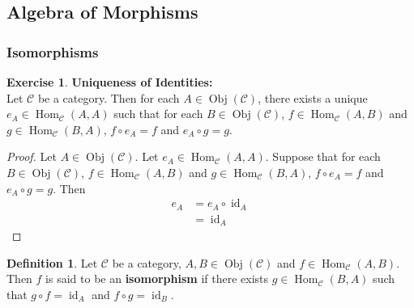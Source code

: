 \documentclass[12pt]{amsart}
\theoremstyle{definition}
\newtheorem{defn}[definition]{Definition}
\newtheorem{ex}[definition]{Exercise}
\newcommand{\MC}{\mathcal{C}}
\DeclareMathOperator{\id}{id}
\DeclareMathOperator{\Obj}{Obj}
\DeclareMathOperator{\Hom}{Hom}
\DeclareMathOperator*{\0}{\mbf{0}}
\DeclareMathOperator*{\1}{\mbf{1}}
\newcommand{\lex}[1]{\label{ex:#1}}
\newcommand{\ld}[1]{\label{defn:#1}}
\begin{document}
	
	
	
	
	
	
	
	
	
	
	
	
	
	
	
	
	
	
	
	
	
	
	
	
	
	
	
	
	
	
	
	
	
	
	
	
	
	
	
	
	
	
	
	
	
	
	
	
	
	
	\newpage
	\subsection{Algebra of Morphisms}
	
	\subsubsection{Isomorphisms}
	
	\begin{ex} \lex{15001} \textbf{Uniqueness of Identities:} \\
		Let $\MC$ be a category. Then for each $A \in \Obj(\MC)$, there exists a unique $e_A \in \Hom_{\MC}(A, A)$ such that for each $B \in \Obj(\MC)$, $f \in \Hom_{\MC}(A, B)$ and $g \in \Hom_{\MC}(B, A)$, $f \circ e_A = f$ and $e_{A} \circ g = g$.
	\end{ex}
	
	\begin{proof}
		Let $A \in \Obj(\MC)$. Let $e_A \in \Hom_{\MC}(A, A)$. Suppose that for each $B \in \Obj(\MC)$, $f \in \Hom_{\MC}(A, B)$ and $g \in \Hom_{\MC}(B, A)$, $f \circ e_A = f$ and $e_{A} \circ g = g$. Then 
		\begin{align*}
			e_A
			& = e_A \circ \id_A \\
			& = \id_A 
		\end{align*}
	\end{proof}
	
	\begin{defn} \ld{15002}
		Let $\MC$ be a category, $A,B \in \Obj(\MC)$ and $f \in \Hom_{\MC}(A, B)$. Then $f$ is said to be an \textbf{isomorphism} if there exists $g \in \Hom_{\MC}(B, A)$ such that $g \circ f = \id_{A}$ and $f \circ g = \id_{B}$. 
	\end{defn}
	
\end{document}
